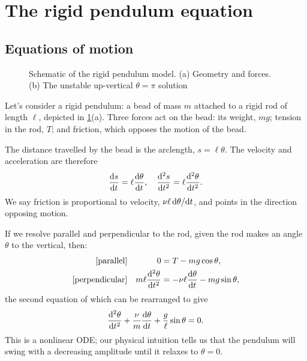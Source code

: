 \documentclass[main.tex]{subfiles}
\begin{document}
\section{The rigid pendulum equation}
\subsection{Equations of motion}
\begin{figure}
\begin{subfigure}[b]{0.69\textwidth}
	\centering
	
\end{subfigure}
\begin{subfigure}[b]{0.29\textwidth}
	\centering
	
\end{subfigure}
\caption{Schematic of the rigid pendulum model. (a) Geometry and forces. (b) The unstable up-vertical $\theta= \pi$ solution}
\label{penschematic}
\end{figure}
Let's consider a rigid pendulum: a bead of mass $m$ attached to a rigid rod of length $\ell$, depicted in \cref{penschematic}(a). Three forces act on the bead: its weight, $mg$; tension in the rod, $T$; and friction, which opposes the motion of the bead. 

The distance travelled by the bead is the arclength, $s=\ell \theta$. The velocity and acceleration are therefore
\begin{equation}
	\fd{s}{t} = \ell\fd{\theta}{t}, \quad \fdd{s}{t} = \ell\fdd{\theta}{t}.
\end{equation}
We say friction is proportional to velocity, $\nu\ell \, \fd{\theta}{t}$, and points in the direction opposing motion.

If we resolve parallel and perpendicular to the rod, given the rod makes an angle $\theta$ to the vertical, then:
\begin{subequations}
\begin{align}
\text{[parallel]} & & 0 &= T - mg\cos\theta, \\
\text{[perpendicular]} & & m \ell\fdd{\theta}{t} &= - \nu\ell \fd{\theta}{t} - mg\sin\theta,
\end{align}
\end{subequations}
the second equation of which can be rearranged to give
\begin{equation}
\label{peneq}
\fdd{\theta}{t} + \frac{\nu}{m} \fd{\theta}{t}+ \frac{g}{\ell}\sin\theta = 0. 
\end{equation} 
This is a nonlinear ODE; our physical intuition tells us that the pendulum will swing with a decreasing amplitude until it relaxes to $\theta=0$. 
\end{document}
